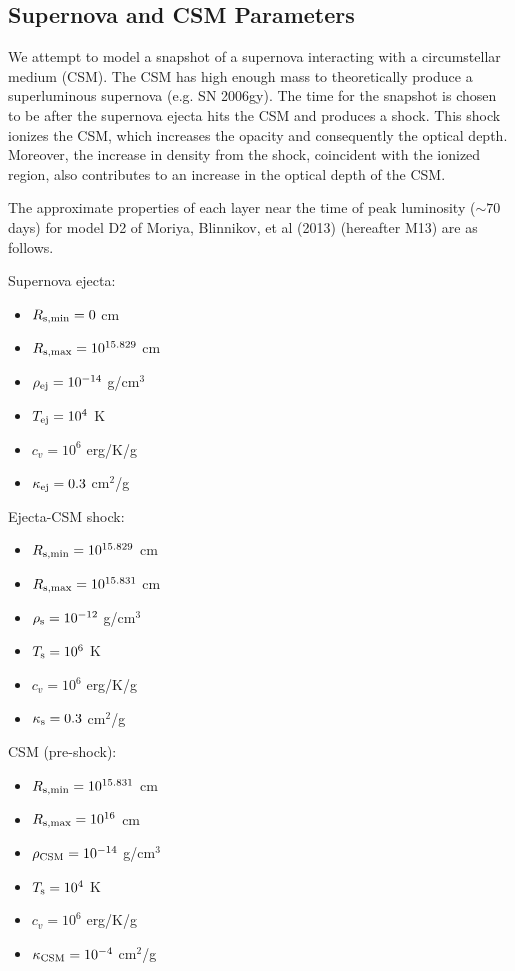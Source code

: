 \documentclass[]{article}
\begin{document}
	\subsection{Supernova and CSM Parameters} \label{sec:sncsmpars}
		We attempt to model a snapshot of a supernova interacting with a circumstellar medium (CSM). The CSM has high enough mass to theoretically produce a superluminous supernova (e.g. SN 2006gy). The time for the snapshot is chosen to be after the supernova ejecta hits the CSM and produces a shock. This shock ionizes the CSM, which increases the opacity and consequently the optical depth. Moreover, the increase in density from the shock, coincident with the ionized region, also contributes to an increase in the optical depth of the CSM.

		The approximate properties of each layer near the time of peak luminosity ($\sim70$ days) for model D2 of Moriya, Blinnikov, et al (2013) (hereafter M13) are as follows.

		Supernova ejecta:
		\begin{itemize}
			\item $R_{\rm s, min} = 0$ cm
			\item $R_{\rm s, max} = 10^{15.829}$ cm
			\item $\rho_{\rm ej} = 10^{-14}$ g/cm$^3$
			\item $T_{\rm ej} = 10^4$ K
			\item $c_v = 10^6$ erg/K/g
			\item $\kappa_{\rm ej} = 0.3$ cm$^2$/g
		\end{itemize}

		Ejecta-CSM shock:
		\begin{itemize}
			\item $R_{\rm s, min} = 10^{15.829}$ cm
			\item $R_{\rm s, max} = 10^{15.831}$ cm
			\item $\rho_{\rm s} = 10^{-12}$ g/cm$^3$
			\item $T_{\rm s} = 10^6$ K
			\item $c_v = 10^6$ erg/K/g
			\item $\kappa_{\rm s} = 0.3$ cm$^2$/g
		\end{itemize}

		CSM (pre-shock):
		\begin{itemize}
			\item $R_{\rm s, min} = 10^{15.831}$ cm
			\item $R_{\rm s, max} = 10^{16}$ cm
			\item $\rho_{\rm CSM} = 10^{-14}$ g/cm$^3$
			\item $T_{\rm s} = 10^4$ K
			\item $c_v = 10^6$ erg/K/g
			\item $\kappa_{\rm CSM} = 10^{-4}$ cm$^2$/g
		\end{itemize}
\end{document}
